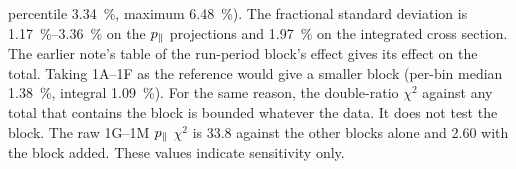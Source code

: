 percentile \SI{3.34}{\percent}, maximum \SI{6.48}{\percent}). The fractional standard deviation is \SIrange{1.17}{3.36}{\percent} on the $p_{\parallel}$ projections and \SI{1.97}{\percent} on the integrated cross section. The earlier note's table of the run-period block's effect gives its effect on the total. Taking 1A--1F as the reference would give a smaller block (per-bin median \SI{1.38}{\percent}, integral \SI{1.09}{\percent}). For the same reason, the double-ratio $\chi^{2}$ against any total that contains the block is bounded whatever the data. It does not test the block. The raw 1G--1M $p_{\parallel}$ $\chi^{2}$ is 33.8 against the other blocks alone and 2.60 with the block added. These values indicate sensitivity only. 
